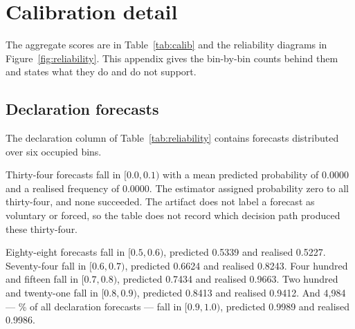 \section{Calibration detail}
\label{app:calibration}

The aggregate scores are in Table~\ref{tab:calib} and the reliability diagrams in
Figure~\ref{fig:reliability}. This appendix gives the bin-by-bin counts behind
them and states what they do and do not support.

\begin{table}[ht]
\centering
\caption{E6: bin-by-bin reliability of the two forecasts \vfast{} makes,
$\Pr[\text{ask succeeds}]$ and $\Pr[\text{allocation correct}]$. Population is
\numCalibDeals{} deals of \vfast{} against \vthree{} under the full dialect, seed 717171,
fitted weights frozen; the experimental unit is the individual forecast, not the
deal or the game, and forecasts are pooled across all six seats. Declaration
forecasts pool voluntary and forced declarations, which are not separated in the
artifact. ``$n$'' is the number of forecasts falling in the bin, ``forecast'' is
their mean predicted probability and ``observed'' the realised frequency. A dash
means no forecast fell in that bin. Every entry is a point estimate: no
clustered interval is attached to any count, mean or frequency in this table.
Source: \texttt{research/v04/results/E6-calibration-v04.txt}.}
\label{tab:reliability}
\small

\end{table}

\subsection{Declaration forecasts}
\label{app:calib-decl}

The declaration column of Table~\ref{tab:reliability} contains
\numDeclN{} forecasts distributed over six occupied bins.

Thirty-four forecasts fall in $[0.0,0.1)$ with a mean predicted probability of
0.0000 and a realised frequency of 0.0000. The estimator assigned probability
zero to all thirty-four, and none succeeded. The artifact does not label a
forecast as voluntary or forced, so the table does not record which decision
path produced these thirty-four.

Eighty-eight forecasts fall in $[0.5,0.6)$, predicted 0.5339 and realised
0.5227. Seventy-four fall in $[0.6,0.7)$, predicted 0.6624 and realised 0.8243.
Four hundred and fifteen fall in $[0.7,0.8)$, predicted 0.7434 and realised
0.9663. Two hundred and twenty-one fall in $[0.8,0.9)$, predicted 0.8413 and
realised 0.9412. And 4{,}984 --- \numDeclTopBinShare\% of all
declaration forecasts --- fall in $[0.9,1.0)$, predicted 0.9989 and realised
0.9986.

